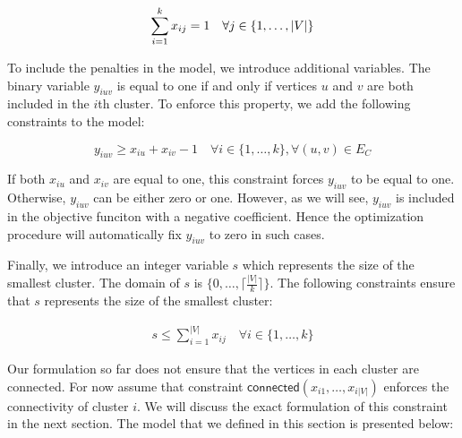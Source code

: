 \documentclass[conference,compsoc]{IEEEtran}
\begin{document}
\begin{equation}
\sum_{i=1}^k x_{ij} = 1 \quad \forall j \in \{1, \ldots, |V|\} \\
\end{equation}

To include the penalties in the model, we introduce additional
variables. The binary variable $y_{iuv}$ is equal to one if and only if
vertices $u$ and $v$ are both included in the $i$th cluster. To enforce
this property, we add the following constraints to the model:

\begin{equation}
y_{iuv} \geq x_{iu} + x_{iv} -1 \quad \forall i \in \{1, \ldots, k\}, \forall (u, v) \in E_{C}
\end{equation}

If both $x_{iu}$ and $x_{iv}$ are equal to one, this constraint forces
$y_{iuv}$ to be equal to one. Otherwise, $y_{iuv}$ can be either zero or
one. However, as we will see, $y_{iuv}$ is included in the objective
funciton with a negative coefficient. Hence the optimization procedure
will automatically fix $y_{iuv}$ to zero in such cases.

Finally, we introduce an integer variable $s$ which represents the size
of the smallest cluster. The domain of $s$ is
$\{0, \ldots, \lceil \frac{|V|}{k} \rceil \}$. The following constraints
ensure that $s$ represents the size of the smallest cluster:

\begin{align}
s \leq \sum_{i=1}^{|V|} x_{ij} \quad \forall i \in \{1, \ldots, k\}
\end{align}

Our formulation so far does not ensure that the vertices in each cluster
are connected. For now assume that constraint
$\mathsf{connected}(x_{i1}, \ldots, x_{i|V|})$ enforces the connectivity of
cluster $i$. We will discuss the exact formulation of this constraint in
the next section. The model that we defined in this section is presented
below:
\end{document}
